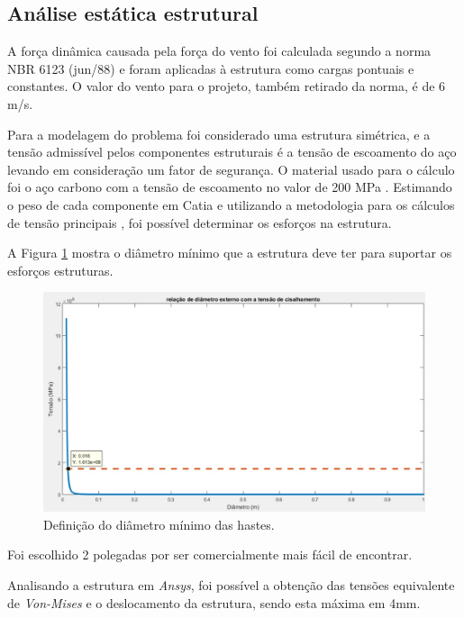 \subsection{Análise estática estrutural}

A força dinâmica causada pela força do vento foi calculada segundo a norma NBR 6123 (jun/88) \cite{ventos} e foram aplicadas à estrutura como cargas pontuais e constantes. O valor do vento para o projeto, também retirado da norma, é de 6 m/s.

Para a modelagem do problema foi considerado uma estrutura simétrica, e a tensão admissível pelos componentes estruturais é a tensão de escoamento do aço levando em consideração um fator de segurança. O material usado para o cálculo foi o aço carbono
com a tensão de escoamento no valor de 200 MPa \cite{callister}. Estimando o peso de cada componente em Catia e utilizando a metodologia para os cálculos de tensão principais \cite{beer}, foi possível determinar os esforços na estrutura.

A Figura \ref{fig:matlab} mostra o diâmetro mínimo que a estrutura deve ter para suportar os esforços estruturas.

        \begin{figure}[H]
	        \centering
            \includegraphics[scale=0.24]{figuras/matlab_hastes.jpg}
            \caption{Definição do diâmetro mínimo das hastes.}
            \label{fig:matlab}
        \end{figure}     

Foi escolhido 2 polegadas por ser comercialmente mais fácil de encontrar.

Analisando a estrutura em \textit{Ansys}, foi possível a obtenção das tensões equivalente de \textit{Von-Mises} e o deslocamento da estrutura, sendo esta máxima em 4mm.

